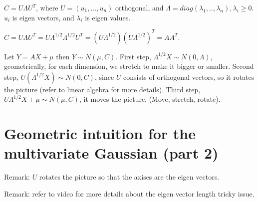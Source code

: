 \documentclass[12pt]{article}
\begin{document}
$C=U\Lambda U^T$, where $U=(u_1,...,u_n)$ orthogonal,
and $\Lambda=diag(\lambda_1,..,\lambda_n), \lambda_i\ge 0$.
$u_i$ is eigen vectors, and $\lambda_i$ is eigen values.

$C=U\Lambda U^T=U\Lambda^{1/2}\Lambda^{1/2}U^T=(U\Lambda^{1/2})(U\Lambda^{1/2})^T=AA^T$.

Let $Y=AX+\mu$ then $Y\sim N(\mu, C)$.
First step, $\Lambda^{1/2} X \sim N(0, \Lambda)$, geometrically,
for each dimension, we stretch to make it bigger or smaller.
Second step, $U(\Lambda^{1/2}X)\sim N(0,C)$, since $U$
consists of orthogonal vectors, so it rotates the picture (refer
to linear algebra for more details).
Third step, $U\Lambda^{1/2}X+\mu\sim N(\mu,C)$, it moves
the picture. (Move, stretch, rotate).

\section{Geometric intuition for the multivariate Gaussian (part 2)}

Remark: $U$ rotates the picture so that the axises are
the eigen vectors.

Remark: refer to video for more details about
the eigen vector length tricky issue.
\end{document}
